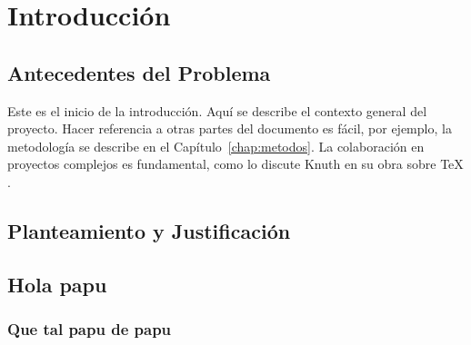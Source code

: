 \chapter{Introducción}
\label{chap:intro}

\section{Antecedentes del Problema}
\label{sec:antecedentes}
Este es el inicio de la introducción. Aquí se describe el contexto general del proyecto.
Hacer referencia a otras partes del documento es fácil, por ejemplo, la metodología se describe en el Capítulo~\ref{chap:metodos}.
La colaboración en proyectos complejos es fundamental, como lo discute Knuth en su obra sobre TeX \cite{knuth1984}.

\section{Planteamiento y Justificación}

\section{Hola papu}
\subsection{Que tal papu de papu}